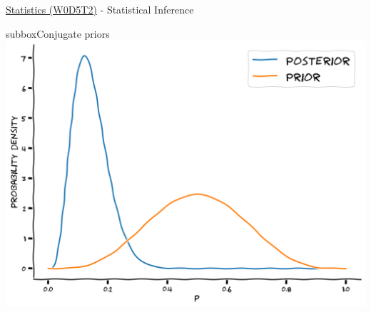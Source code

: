\begin{multicols}{3}
\begin{textbox}{\href{https://compneuro.neuromatch.io/tutorials/W0D5_Statistics/student/W0D5_Tutorial2.html}{Statistics (W0D5T2)} - Statistical Inference}
\begin{subbox}{subbox}{Conjugate priors}
\centering
\includegraphics[scale=0.3]{Figures/PreCourse/SFigure3.png}

\end{subbox}
\end{textbox}
\end{multicols}